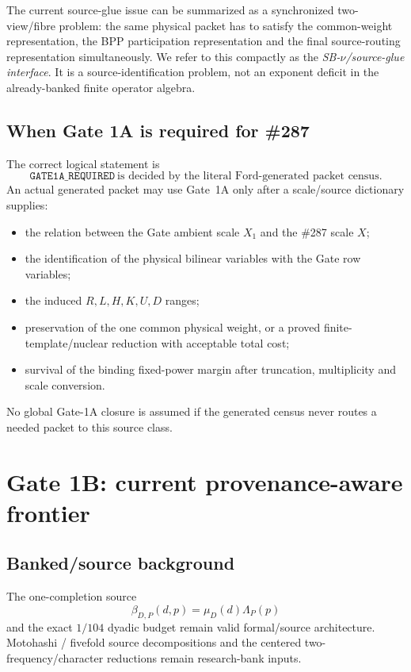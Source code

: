 \documentclass[11pt]{article}
\theoremstyle{definition}
\newcommand{\1}{\mathbf 1}
\begin{document}
The current source-glue issue can be summarized as a synchronized two-view/fibre problem:
the same physical packet has to satisfy the common-weight representation, the BPP
participation representation and the final source-routing representation simultaneously.
We refer to this compactly as the \emph{SB-$\nu$/source-glue interface}.  It is a
source-identification problem, not an exponent deficit in the already-banked finite
operator algebra.

\subsection{When Gate 1A is required for \#287}

The correct logical statement is
\[
\boxed{
\texttt{GATE1A\_REQUIRED}
\ \text{is decided by the literal Ford-generated packet census.}
}
\]
An actual generated packet may use Gate~1A only after a scale/source dictionary supplies:
\begin{itemize}[leftmargin=1.6em]
\item the relation between the Gate ambient scale $X_1$ and the \#287 scale $X$;
\item the identification of the physical bilinear variables with the Gate row variables;
\item the induced $R,L,H,K,U,D$ ranges;
\item preservation of the one common physical weight, or a proved finite-template/nuclear
  reduction with acceptable total cost;
\item survival of the binding fixed-power margin after truncation, multiplicity and
  scale conversion.
\end{itemize}
No global Gate-1A closure is assumed if the generated census never routes a needed packet
to this source class.

\section{Gate 1B: current provenance-aware frontier}

\subsection{Banked/source background}

The one-completion source
\[
\beta_{D,P}(d,p)=\mu_D(d)\Lambda_P(p)
\]
and the exact $1/104$ dyadic budget remain valid formal/source architecture.  Motohashi /
fivefold source decompositions and the centered two-frequency/character reductions remain
research-bank inputs.
\end{document}
